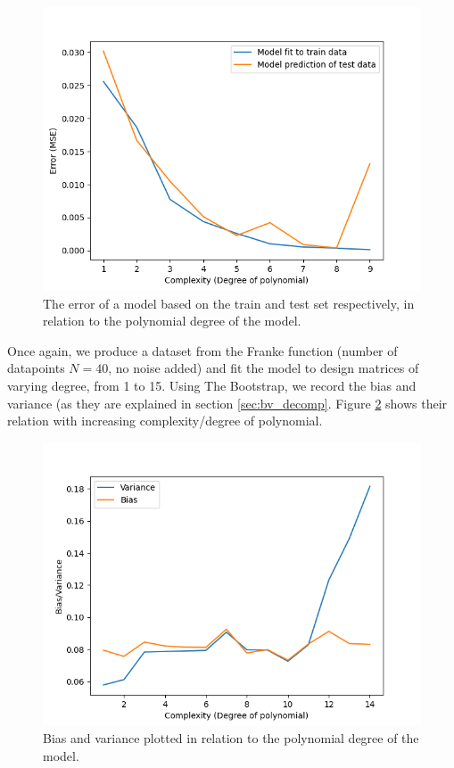 \documentclass[../main.tex]{subfiles}
\begin{document}
\begin{figure}[h]
    \centering
    \includegraphics[width=\textwidth]{../assets/complexity.png}
    \caption{The error of a model based on the train and test set respectively, in relation to the polynomial degree of the model.}
    \label{fig:result_complexity}
\end{figure}

Once again, we produce a dataset from the Franke function (number of datapoints $N=40$, no noise added) and fit the model to design matrices of varying degree, from 1 to 15. Using The Bootstrap, we record the bias and variance (as they are explained in section \ref{sec:bv_decomp}. Figure \ref{fig:result_bias_variance} shows their relation with increasing complexity/degree of polynomial. 

\begin{figure}[h]
    \centering
    \includegraphics[width=\textwidth]{../assets/var.png}
    \caption{Bias and variance plotted in relation to the polynomial degree of the model.}
    \label{fig:result_bias_variance}
\end{figure}
\end{document}
